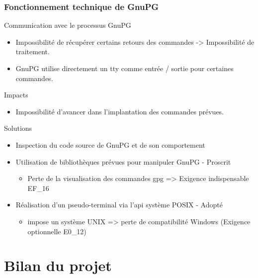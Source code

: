     \begin{frame}
      \frametitle{\color{white}Fonctionnement technique de GnuPG}
      \begin{block}{Communication avec le processus GnuPG}
        \begin{itemize}
	         \item Impossibilité de récupérer certains retours des commandes -> Impossibilité de traitement.
          \item GnuPG utilise directement un tty comme entrée / sortie pour certaines commandes.
        \end{itemize}
      \end{block}
       
      \begin{alertblock}{Impacts}
        \begin{itemize}
          \item Impossibilité d'avancer dans l'implantation des commandes prévues.
        \end{itemize}
      \end{alertblock}
        
      \begin{exampleblock}{Solutions}
        \begin{itemize}
          \item Inspection du code source de GnuPG et de son comportement
          \item Utilisation de bibliothèques prévues pour manipuler GnuPG - {\color{red}Proscrit}
	    \begin{itemize}
	     \item Perte de la visualisation des commandes gpg => Exigence indispensable EF\_16
	    \end{itemize}
          \item Réalisation d'un pseudo-terminal via l'api système POSIX - {\color{green}Adopté}
	    \begin{itemize}
	     \item impose un système UNIX => perte de compatibilité Windows (Exigence optionnelle E0\_12)
	    \end{itemize}
        \end{itemize}
      \end{exampleblock}
    \end{frame}

\section{Bilan du projet}
  
